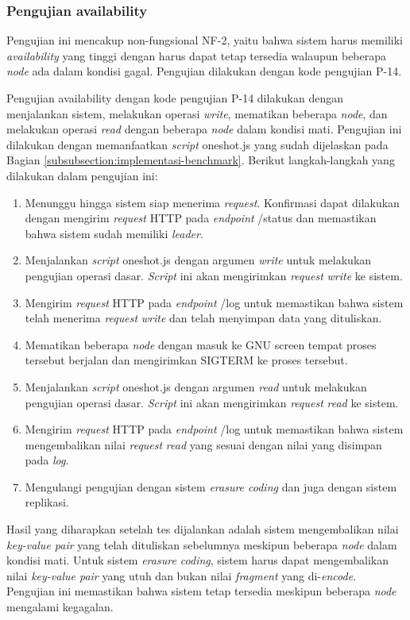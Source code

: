 \subsubsection{Pengujian availability}
\label{subsubsection:pengujian-availability}

Pengujian ini mencakup non-fungsional NF-2, yaitu bahwa sistem harus memiliki \textit{availability} yang tinggi dengan harus dapat tetap tersedia walaupun beberapa \textit{node} ada dalam kondisi gagal. Pengujian dilakukan dengan kode pengujian P-14.


Pengujian availability dengan kode pengujian P-14 dilakukan dengan menjalankan sistem, melakukan operasi \textit{write}, mematikan beberapa \textit{node}, dan melakukan operasi \textit{read} dengan beberapa \textit{node} dalam kondisi mati. Pengujian ini dilakukan dengan memanfaatkan \textit{script} oneshot.js yang sudah dijelaskan pada Bagian \ref{subsubsection:implementasi-benchmark}. Berikut langkah-langkah yang dilakukan dalam pengujian ini:

\begin{enumerate}
    \item Menunggu hingga sistem siap menerima \textit{request}. Konfirmasi dapat dilakukan dengan mengirim \textit{request} HTTP pada \textit{endpoint} /status dan memastikan bahwa sistem sudah memiliki \textit{leader}.
    \item Menjalankan \textit{script} oneshot.js dengan argumen \textit{write} untuk melakukan pengujian operasi dasar. \textit{Script} ini akan mengirimkan \textit{request} \textit{write} ke sistem.
    \item Mengirim \textit{request} HTTP pada \textit{endpoint} /log untuk memastikan bahwa sistem telah menerima \textit{request} \textit{write} dan telah menyimpan data yang dituliskan.
    \item Mematikan beberapa \textit{node} dengan masuk ke GNU screen tempat proses tersebut berjalan dan mengirimkan SIGTERM ke proses tersebut.
    \item Menjalankan \textit{script} oneshot.js dengan argumen \textit{read} untuk melakukan pengujian operasi dasar. \textit{Script} ini akan mengirimkan \textit{request} \textit{read} ke sistem.
    \item Mengirim \textit{request} HTTP pada \textit{endpoint} /log untuk memastikan bahwa sistem mengembalikan nilai \textit{request} \textit{read} yang sesuai dengan nilai yang disimpan pada \textit{log}.
    \item Mengulangi pengujian dengan sistem \textit{erasure coding} dan juga dengan sistem replikasi.
\end{enumerate}

Hasil yang diharapkan setelah tes dijalankan adalah sistem mengembalikan nilai \textit{key-value pair} yang telah dituliskan sebelumnya meskipun beberapa \textit{node} dalam kondisi mati. Untuk sistem \textit{erasure coding}, sistem harus dapat mengembalikan nilai \textit{key-value pair} yang utuh dan bukan nilai \textit{fragment} yang di-\textit{encode}. Pengujian ini memastikan bahwa sistem tetap tersedia meskipun beberapa \textit{node} mengalami kegagalan.